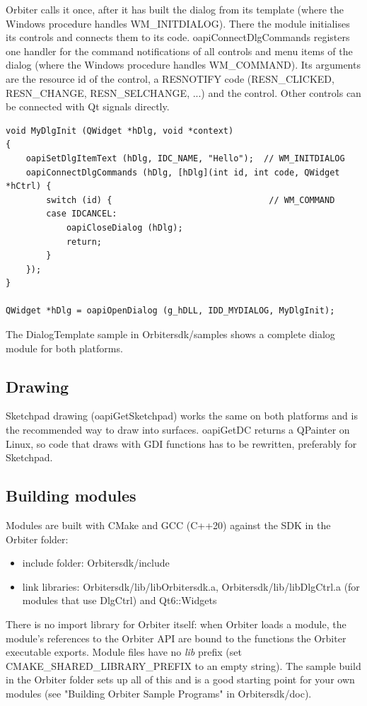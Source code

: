\documentclass[Orbiter Developer Manual.tex]{subfiles}
\begin{document}
\noindent
Orbiter calls it once, after it has built the dialog from its template (where the Windows procedure handles WM\_INITDIALOG). There the module initialises its controls and connects them to its code. oapiConnectDlgCommands registers one handler for the command notifications of all controls and menu items of the dialog (where the Windows procedure handles WM\_COMMAND). Its arguments are the resource id of the control, a RESNOTIFY code (RESN\_CLICKED, RESN\_CHANGE, RESN\_SELCHANGE, ...) and the control. Other controls can be connected with Qt signals directly.

\begin{lstlisting}
void MyDlgInit (QWidget *hDlg, void *context)
{
	oapiSetDlgItemText (hDlg, IDC_NAME, "Hello");  // WM_INITDIALOG
	oapiConnectDlgCommands (hDlg, [hDlg](int id, int code, QWidget *hCtrl) {
		switch (id) {                               // WM_COMMAND
		case IDCANCEL:
			oapiCloseDialog (hDlg);
			return;
		}
	});
}

QWidget *hDlg = oapiOpenDialog (g_hDLL, IDD_MYDIALOG, MyDlgInit);
\end{lstlisting}

\noindent
The DialogTemplate sample in Orbitersdk/samples shows a complete dialog module for both platforms.


\subsection{Drawing}
Sketchpad drawing (oapiGetSketchpad) works the same on both platforms and is the recommended way to draw into surfaces. oapiGetDC returns a QPainter on Linux, so code that draws with GDI functions has to be rewritten, preferably for Sketchpad.


\subsection{Building modules}
Modules are built with CMake and GCC (C++20) against the SDK in the Orbiter folder:

\begin{itemize}
\item include folder: Orbitersdk/include
\item link libraries: Orbitersdk/lib/libOrbitersdk.a, Orbitersdk/lib/libDlgCtrl.a (for modules that use DlgCtrl) and Qt6::Widgets
\end{itemize}

\noindent
There is no import library for Orbiter itself: when Orbiter loads a module, the module's references to the Orbiter API are bound to the functions the Orbiter executable exports. Module files have no \textit{lib} prefix (set CMAKE\_SHARED\_LIBRARY\_PREFIX to an empty string). The sample build in the Orbiter folder sets up all of this and is a good starting point for your own modules (see "Building Orbiter Sample Programs" in Orbitersdk/doc).
\end{document}
